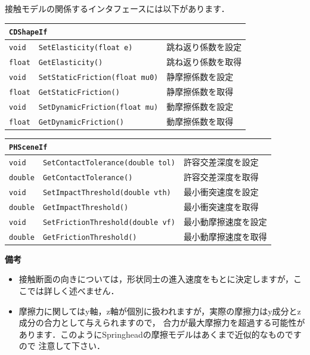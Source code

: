 \KLUDGE 接触モデルの関係するインタフェースには以下があります．
\begin{center}
\begin{longtable}{p{.1\hsize}p{.5\hsize}p{.4\hsize}}
\multicolumn{3}{l}{\texttt{CDShapeIf}}						\\ \midrule
\texttt{void}	& \texttt{SetElasticity(float e)}       & 跳ね返り係数を設定 \\
\texttt{float}  & \texttt{GetElasticity()}              & 跳ね返り係数を取得 \\
\texttt{void}   & \texttt{SetStaticFriction(float mu0)} & 静摩擦係数を設定 \\
\texttt{float}  & \texttt{GetStaticFriction()}          & 静摩擦係数を取得 \\
\texttt{void}   & \texttt{SetDynamicFriction(float mu)} & 動摩擦係数を設定 \\
\texttt{float}  & \texttt{GetDynamicFriction()}         & 動摩擦係数を取得
\end{longtable}
\end{center}

\begin{center}
\begin{longtable}{p{.1\hsize}p{.5\hsize}p{.4\hsize}}
\multicolumn{3}{l}{\texttt{PHSceneIf}}						\\ \midrule
\texttt{void}	& \texttt{SetContactTolerance(double tol)} & 許容交差深度を設定 \\
\texttt{double} & \texttt{GetContactTolerance()}           & 許容交差深度を取得 \\
\texttt{void}   & \texttt{SetImpactThreshold(double vth)}  & 最小衝突速度を設定 \\
\texttt{double} & \texttt{GetImpactThreshold()}            & 最小衝突速度を取得 \\
\texttt{void}   & \texttt{SetFrictionThreshold(double vf)} & 最小動摩擦速度を設定 \\
\texttt{double} & \texttt{GetFrictionThreshold()}          & 最小動摩擦速度を取得
\end{longtable}
\end{center}

\noindent\textbf{備考}
\begin{itemize}
\item 接触断面の向きについては，形状同士の進入速度をもとに決定しますが，ここでは詳しく述べません．
\item 摩擦力に関してはy軸，z軸が個別に扱われますが，実際の摩擦力はy成分とz成分の合力として与えられますので，
\KLUDGE 合力が最大摩擦力を超過する可能性があります．このようにSpringheadの摩擦モデルはあくまで近似的なものですので
\KLUDGE 注意して下さい．
\end{itemize}

